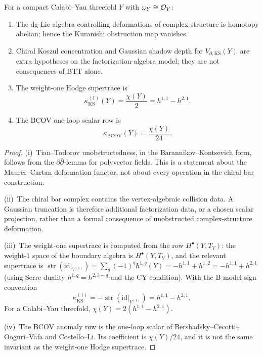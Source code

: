 \begin{theorem}
For a compact Calabi--Yau threefold $Y$ with $\omega_Y\cong\mathcal O_Y$:
\begin{enumerate}[label=(\roman*),leftmargin=1.8em]
\item The dg Lie algebra controlling deformations of complex
structure is homotopy abelian; hence the Kuranishi obstruction map
vanishes.
\item Chiral Koszul concentration and Gaussian shadow depth for
$V_{\partial,\mathrm{KS}}(Y)$ are extra hypotheses on the
factorization-algebra model; they are not consequences of BTT alone.
\item The weight-one Hodge supertrace is
\begin{equation}%
\kappa_{\mathrm{KS}}^{(1)}(Y) = \frac{\chi(Y)}{2}
= h^{1,1}-h^{2,1}.
\end{equation}
\item The BCOV one-loop scalar row is
\[
\kappa_{\mathrm{BCOV}}(Y)=\frac{\chi(Y)}{24}.
\]
\end{enumerate}
\end{theorem}

\begin{proof}
(i)~Tian--Todorov unobstructedness, in the Barannikov--Kontsevich
form, follows from the $\partial\bar\partial$-lemma for polyvector
fields. This is a statement about the Maurer--Cartan deformation
functor, not about every operation in the chiral bar construction.

(ii)~The chiral bar complex contains the vertex-algebraic collision
data. A Gaussian truncation is therefore additional factorization
data, or a chosen scalar projection, rather than a formal consequence
of unobstructed complex-structure deformation.

(iii)~The weight-one supertrace is
computed from the row $H^\bullet(Y,T_Y)$:
the weight-$1$ space of the boundary algebra is
$H^\bullet(Y,T_Y)$, and the relevant supertrace is
$\operatorname{str}(\mathrm{id}|_{V^{(1)}})
= \sum_q (-1)^q h^{1,q}(Y)
= -h^{1,1} + h^{1,2}
= -h^{1,1} + h^{2,1}$
(using Serre duality $h^{1,q} = h^{2,3-q}$ and the CY condition).
With the B-model sign convention
\[
\kappa_{\mathrm{KS}}^{(1)}
=-\operatorname{str}(\mathrm{id}|_{V^{(1)}})
= h^{1,1} - h^{2,1}.
\]
For a Calabi--Yau threefold, $\chi(Y)=2(h^{1,1}-h^{2,1})$.

(iv)~The BCOV anomaly row is the one-loop scalar of
Bershadsky--Cecotti--Ooguri--Vafa and Costello--Li. Its coefficient
is $\chi(Y)/24$, and it is not the same invariant as the
weight-one Hodge supertrace.
\end{proof}


